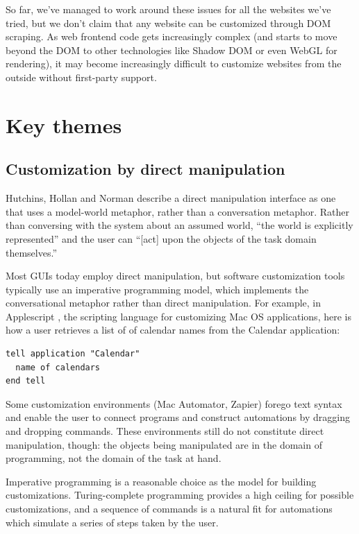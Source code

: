 \documentclass[sigplan,10pt,anonymous,review]{acmart}
\begin{document}
So far, we've managed to work around these issues for all the websites
we've tried, but we don't claim that any website can be customized
through DOM scraping. As web frontend code gets increasingly complex
(and starts to move beyond the DOM to other technologies like Shadow DOM
or even WebGL for rendering), it may become increasingly difficult to
customize websites from the outside without first-party support.

\hypertarget{sec:themes}{%
\section{Key themes}\label{sec:themes}}

\hypertarget{sec:dm}{%
\subsection{Customization by direct manipulation}\label{sec:dm}}

Hutchins, Hollan and Norman \citep{hutchins1985} describe a direct
manipulation interface as one that uses a model-world metaphor, rather
than a conversation metaphor. Rather than conversing with the system
about an assumed world, ``the world is explicitly represented'' and the
user can ``{[}act{]} upon the objects of the task domain themselves.''

Most GUIs today employ direct manipulation, but software customization
tools typically use an imperative programming model, which implements
the conversational metaphor rather than direct manipulation. For
example, in Applescript \citep{cook2007}, the scripting language for
customizing Mac OS applications, here is how a user retrieves a list of
of calendar names from the Calendar application:

\begin{verbatim}
tell application "Calendar"
  name of calendars
end tell
\end{verbatim}

Some customization environments (Mac Automator, Zapier) forego text
syntax and enable the user to connect programs and construct automations
by dragging and dropping commands. These environments still do not
constitute direct manipulation, though: the objects being manipulated
are in the domain of programming, not the domain of the task at hand.

Imperative programming is a reasonable choice as the model for building
customizations. Turing-complete programming provides a high ceiling for
possible customizations, and a sequence of commands is a natural fit for
automations which simulate a series of steps taken by the user.
\end{document}
